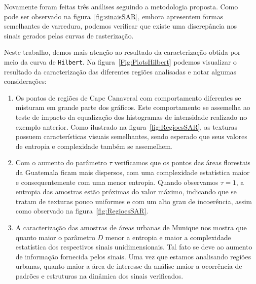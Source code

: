\documentclass[remotesensing,article,submit,moreauthors,pdftex,10pt,a4paper]{Definitions/mdpi}
\begin{document}
	Novamente foram feitas três análises seguindo a metodologia proposta. Como pode ser observado na figura~\ref{fig:sinaisSAR}, embora apresentem formas semelhantes de varredura, podemos verificar que existe uma discrepância nos sinais gerados pelas curvas de rasterização. 
	
	Neste trabalho, demos mais atenção ao resultado da caracterização obtida por meio da curva de \texttt{Hilbert}.
	Na figura~\ref{Fig:PlotsHilbert} podemos visualizar o resultado da caracterização das diferentes regiões analisadas e notar algumas considerações:
	
	\begin{enumerate}
		\item Os pontos de regiões de Cape Canaveral com comportamento diferentes se misturam em grande parte dos gráficos. Este comportamento se assemelha ao teste de impacto da equalização dos histogramas de intensidade realizado no exemplo anterior. Como ilustrado na figura~\ref{fig:RegioesSAR}, as texturas possuem características visuais semelhantes, sendo esperado que seus valores de entropia e complexidade também se assemelhem.
		\item Com o aumento do parâmetro $\tau$ verificamos que os pontos das áreas florestais da Guatemala ficam mais dispersos, com uma complexidade estatística maior e consequentemente com uma menor entropia. Quando observamos $\tau = 1$, a entropia das amostras estão próximas do valor máximo, indicando que se tratam de texturas pouco uniformes e com um alto grau de incoerência, assim como observado na figura~\ref{fig:RegioesSAR}.
		\item A caracterização das amostras de áreas urbanas de Munique nos mostra que quanto maior o parâmetro $D$ menor a entropia e maior a complexidade estatística dos respectivos sinais unidimensionais. Tal fato se deve ao aumento de informação fornecida pelos sinais. Uma vez que estamos analisando regiões urbanas, quanto maior a área de interesse da análise maior a ocorrência de padrões e estruturas na dinâmica dos sinais verificados.
	\end{enumerate}
	
\end{document}
